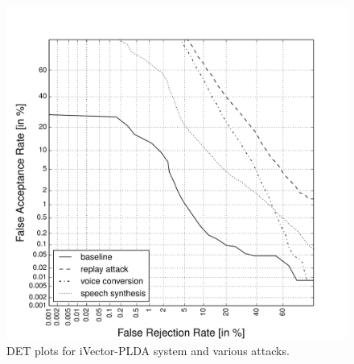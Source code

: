 

\begin{figure}[!t]
	\centering
	\includegraphics[width=1\linewidth]{Figs/DETs_IV_ss_vc_rp.pdf}
	\caption{DET plots for iVector-PLDA system and various attacks.}
	\label{fig::DETs_4attacks}
\end{figure}

